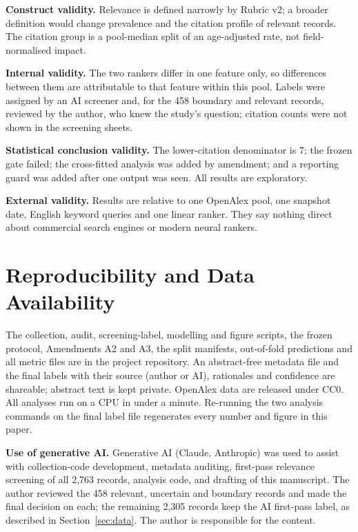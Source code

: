 \documentclass[acmsmall,screen,nonacm]{acmart}
\begin{document}
\textbf{Construct validity.} Relevance is defined narrowly by Rubric v2; a broader definition would change
prevalence and the citation profile of relevant records. The citation group is a pool-median split of an
age-adjusted rate, not field-normalised impact.

\textbf{Internal validity.} The two rankers differ in one feature only, so differences between them are
attributable to that feature within this pool. Labels were assigned by an AI screener and, for the 458
boundary and relevant records, reviewed by the author, who knew the study's question; citation counts were
not shown in the screening sheets.

\textbf{Statistical conclusion validity.} The lower-citation denominator is 7; the frozen gate failed;
the cross-fitted analysis was added by amendment; and a reporting guard was added after one output was
seen. All results are exploratory.

\textbf{External validity.} Results are relative to one OpenAlex pool, one snapshot date, English keyword
queries and one linear ranker. They say nothing direct about commercial search engines or modern neural
rankers.

\section{Reproducibility and Data Availability}

The collection, audit, screening-label, modelling and figure scripts, the frozen protocol, Amendments A2
and A3, the split manifests, out-of-fold predictions and all metric files are in the project repository.
An abstract-free metadata file and the final labels with their source (author or AI), rationales and
confidence are shareable; abstract text is kept private. OpenAlex data are released under CC0. All analyses run on a CPU in under a minute.
Re-running the two analysis commands on the final label file regenerates every number and figure in this
paper.

\begin{acks}
\textbf{Use of generative AI.} Generative AI (Claude, Anthropic) was used to assist with collection-code
development, metadata auditing, first-pass relevance screening of all 2,763 records, analysis code, and
drafting of this manuscript. The author reviewed the 458 relevant, uncertain and boundary records and made
the final decision on each; the remaining 2,305 records keep the AI first-pass label, as described in
Section~\ref{sec:data}. The author is responsible for the content.
\end{acks}



\end{document}
